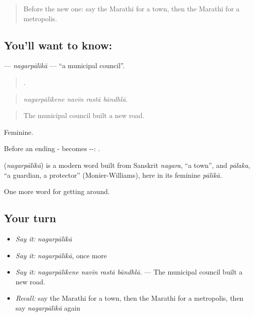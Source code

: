 \label{lesson:MR-C418-nagarpalika}



\begin{quote}
Before the new one: say the Marathi for a town, then the Marathi for a metropolis.
\end{quote}

\subsection*{You'll want to know: }
\textbf{} — \emph{nagarpālikā} — \textquotedblleft{}a municipal council\textquotedblright{}.

\begin{quote}
   .
\end{quote}

\begin{quote}
\emph{nagarpālikene navīn rastā bāndhlā.}
\end{quote}

\begin{quote}
The municipal council built a new road.
\end{quote}

Feminine.

Before an ending - becomes --: .

\begin{cousinweb}
\textbf{} (\emph{nagarpālikā}) is a modern word built from Sanskrit \emph{nagara}, \textquotedblleft{}a town\textquotedblright{}, and \emph{pālaka}, \textquotedblleft{}a guardian, a protector\textquotedblright{} (Monier-Williams), here in its feminine \emph{pālikā}.
\end{cousinweb}

\begin{grammarlens}[title={What you've built}]
One more word for getting around.
\end{grammarlens}

\subsection*{Your turn}
\begin{itemize}
\raggedright
  \item \emph{Say it:} \emph{nagarpālikā}
  \item \emph{Say it:} \emph{nagarpālikā}, once more
  \item \emph{Say it:} \emph{nagarpālikene navīn rastā bāndhlā.} — The municipal council built a new road.
  \item \emph{Recall:} say the Marathi for a town, then the Marathi for a metropolis, then say \emph{nagarpālikā} again
\end{itemize}


